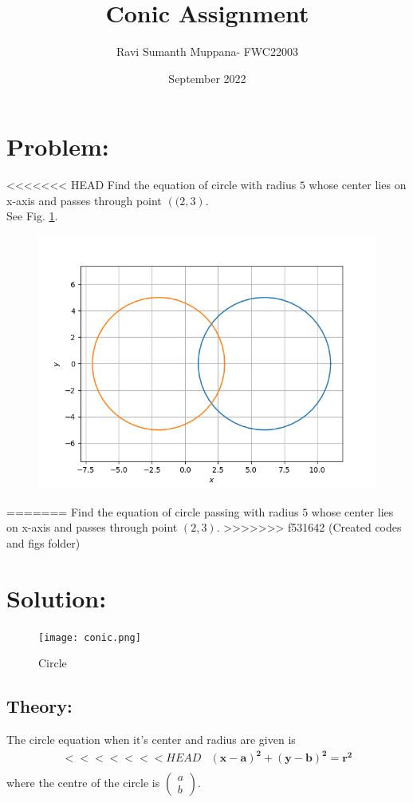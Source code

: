 \documentclass[a4paper,12pt,twocolumn]{article}
\title{Conic Assignment}
\author{Ravi Sumanth Muppana- FWC22003}
\date{September 2022}
\let\vec\mathbf
\newcommand{\myvec}[1]{\ensuremath{\begin{pmatrix}#1\end{pmatrix}}}
\providecommand{\brak}[1]{\ensuremath{\left((#1\right)}}
\begin{document}
\maketitle
\section{Problem:}
<<<<<<< HEAD
\fi
Find the equation of circle with radius $5$ whose center lies on x-axis and passes through point $\brak{2,3}$.
\\
\solution 
See Fig. 
		\ref{fig:11/11/1/12}.
	\begin{figure}[!ht]
		\centering
 \includegraphics[width=\columnwidth]{chapters/11/11/1/12/figs/conic.png}
		\caption{}
		\label{fig:11/11/1/12}
  	\end{figure}
\iffalse
=======
Find the equation of circle passing with radius $5$ whose center lies on x-axis and passes through point $(2,3)$.
>>>>>>> f531642 (Created codes and figs folder)
\maketitle
\section{Solution:}
\begin{figure}[h]
	\texttt{[image: conic.png]}
\caption{Circle}
\end{figure}
\subsection{Theory:}
The circle equation when it's center and radius are given is
\begin{align}
<<<<<<< HEAD
	&\vec{(x-a)^2} + \vec{(y-b)^2} = \vec{r^2}\\
\end{align}
where the centre of the circle is $\myvec{a\\b}$.
\end{document}

